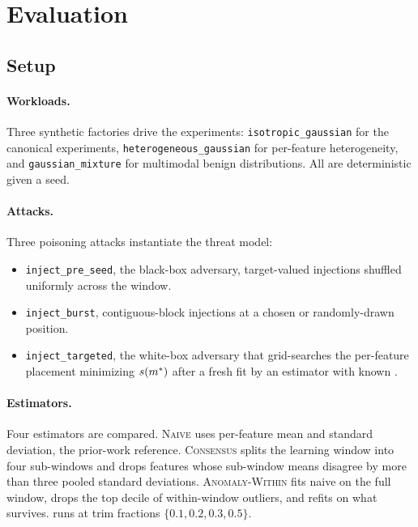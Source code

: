 \section{Evaluation}
\label{sec:evaluation}

\subsection{Setup}

\paragraph{Workloads.} Three synthetic factories drive the
experiments: \texttt{isotropic\_gaussian} for the canonical
experiments, \texttt{heterogeneous\_gaussian} for per-feature
heterogeneity, and \texttt{gaussian\_mixture} for multimodal benign
distributions. All are deterministic given a seed.

\paragraph{Attacks.} Three poisoning attacks instantiate the threat
model:
\begin{itemize}
\item \texttt{inject\_pre\_seed}, the black-box adversary,
  target-valued injections shuffled uniformly across the window.
\item \texttt{inject\_burst}, contiguous-block injections at a
  chosen or randomly-drawn position.
\item \texttt{inject\_targeted}, the white-box adversary that
  grid-searches the per-feature placement minimizing
  $s(m^{*})$ after a fresh fit by an estimator with known
  \trim{}.
\end{itemize}

\paragraph{Estimators.} Four estimators are compared.
\textsc{Naive} uses per-feature mean and standard deviation, the
prior-work reference. \textsc{Consensus} splits the learning window
into four sub-windows and drops features whose sub-window means
disagree by more than three pooled standard deviations.
\textsc{Anomaly-Within} fits naive on the full window, drops the
top decile of within-window outliers, and refits on what survives.
\sediment{} runs at trim fractions $\{0.1, 0.2, 0.3, 0.5\}$.

